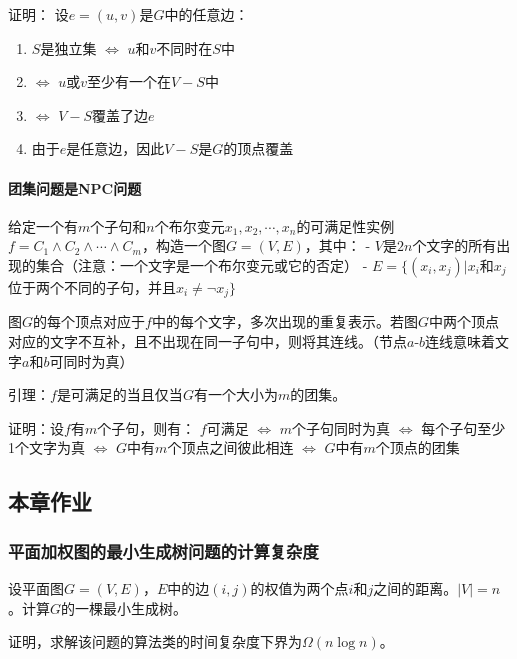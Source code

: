 \documentclass[./../main.tex]{subfiles}
\begin{document}
证明：
设$e=(u,v)$是$G$中的任意边：

\begin{enumerate}
    \item $S$是独立集 $\Leftrightarrow$ $u$和$v$不同时在$S$中
    \item $\Leftrightarrow$ $u$或$v$至少有一个在$V-S$中
    \item $\Leftrightarrow$ $V-S$覆盖了边$e$
    \item 由于$e$是任意边，因此$V-S$是$G$的顶点覆盖
\end{enumerate}

\paragraph{团集问题是NPC问题}

给定一个有$m$个子句和$n$个布尔变元$x_{1},x_{2},\cdots,x_{n}$的可满足性实例$f=C_{1}\wedge C_{2}\wedge\cdots\wedge C_{m}$，构造一个图$G=(V,E)$，其中：
- $V$是$2n$个文字的所有出现的集合（注意：一个文字是一个布尔变元或它的否定）
- $E=\{(x_{i},x_{j}) | x_{i}$和$x_{j}$位于两个不同的子句，并且$x_{i}\neq \neg x_{j}\}$

图$G$的每个顶点对应于$f$中的每个文字，多次出现的重复表示。若图$G$中两个顶点对应的文字不互补，且不出现在同一子句中，则将其连线。（节点$a$-$b$连线意味着文字$a$和$b$可同时为真）

引理：$f$是可满足的当且仅当$G$有一个大小为$m$的团集。

证明：设$f$有$m$个子句，则有：
$f$可满足 $\Leftrightarrow$ $m$个子句同时为真
$\Leftrightarrow$ 每个子句至少1个文字为真
$\Leftrightarrow$ $G$中有$m$个顶点之间彼此相连
$\Leftrightarrow$ $G$中有$m$个顶点的团集

\subsection{本章作业}
\subsubsection{平面加权图的最小生成树问题的计算复杂度}
设平面图$G=(V, E)$，$E$中的边$(i,j)$的权值为两个点$i$和$j$之间的距离。$|V|=n$。计算$G$的一棵最小生成树。

证明，求解该问题的算法类的时间复杂度下界为$\Omega(n\log n)$。
\end{document}
